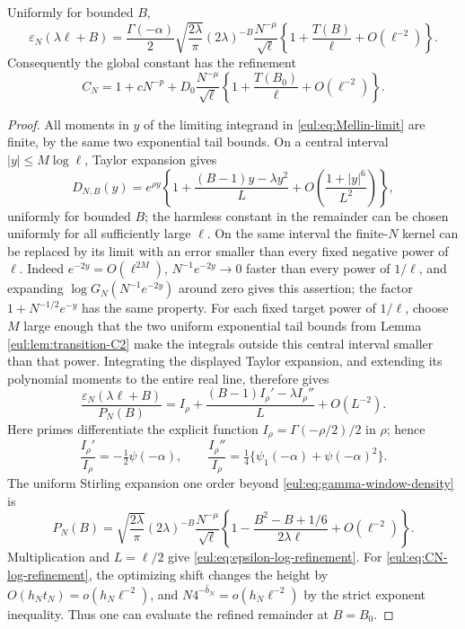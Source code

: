 \begin{proposition}
\label{eul:prop:logarithmic-refinement}
Uniformly for bounded $B$,
\begin{equation}\label{eul:eq:epsilon-log-refinement}
 \varepsilon_N(\lambda\ell+B)
 =\frac{\Gamma(-\alpha)}2\sqrt{\frac{2\lambda}{\pi}}
   (2\lambda)^{-B}\frac{N^{-\mu}}{\sqrt\ell}
   \left\{1+\frac{T(B)}\ell+O(\ell^{-2})\right\}.
\end{equation}
Consequently the global constant has the refinement
\begin{equation}\label{eul:eq:CN-log-refinement}
 C_N=1+cN^{-p}
  +D_0\frac{N^{-\mu}}{\sqrt\ell}
     \left\{1+\frac{T(B_0)}\ell+O(\ell^{-2})\right\}.
\end{equation}
\end{proposition}
\begin{proof}
All moments in $y$ of the limiting integrand in
\eqref{eul:eq:Mellin-limit} are finite, by the same two exponential
tail bounds.  On a central interval $|y|\leq M\log\ell$, Taylor
expansion gives
\[
 D_{N,B}(y)=e^{\rho y}
 \left\{1+\frac{(B-1)y-\lambda y^2}{L}
     +O\!\left(\frac{1+|y|^6}{L^2}\right)\right\},
\]
uniformly for bounded $B$; the harmless constant in the remainder
can be chosen uniformly for all sufficiently large $\ell$.
On the same interval the finite-$N$ kernel can be replaced by its
limit with an error smaller than every fixed negative power of
$\ell$.  Indeed $e^{-2y}=O(\ell^{2M})$,
$N^{-1}e^{-2y}\to0$ faster than every power of $1/\ell$,
and expanding $\log G_N(N^{-1}e^{-2y})$ around zero gives this
assertion; the factor $1+N^{-1/2}e^{-y}$ has the same property.
For each fixed target power of $1/\ell$, choose $M$ large enough
that the two uniform exponential tail bounds from Lemma
\ref{eul:lem:transition-C2} make the integrals outside this central
interval smaller than that power.  Integrating the displayed Taylor
expansion, and extending its polynomial moments to the entire real
line, therefore gives
\[
 \frac{\varepsilon_N(\lambda\ell+B)}{P_N(B)}
 =I_\rho+\frac{(B-1)I_\rho'-\lambda I_\rho''}{L}
       +O(L^{-2}).
\]
Here primes differentiate the explicit function
$I_\rho=\Gamma(-\rho/2)/2$ in $\rho$; hence
\[
 \frac{I_\rho'}{I_\rho}=-\tfrac12\psi(-\alpha),\qquad
 \frac{I_\rho''}{I_\rho}=
       \tfrac14\{\psi_1(-\alpha)+\psi(-\alpha)^2\}.
\]
The uniform Stirling expansion one order beyond
\eqref{eul:eq:gamma-window-density} is
\[
 P_N(B)=\sqrt{\frac{2\lambda}{\pi}}(2\lambda)^{-B}
 \frac{N^{-\mu}}{\sqrt\ell}
 \left\{1-\frac{B^2-B+1/6}{2\lambda\ell}
              +O(\ell^{-2})\right\}.
\]
Multiplication and $L=\ell/2$ give
\eqref{eul:eq:epsilon-log-refinement}.
For \eqref{eul:eq:CN-log-refinement}, the optimizing shift changes
the height by $O(h_Nt_N)=o(h_N\ell^{-2})$, and
$N4^{-\widehat b_N}=o(h_N\ell^{-2})$ by the strict exponent
inequality.  Thus one can evaluate the refined remainder at $B=B_0$.
\end{proof}

